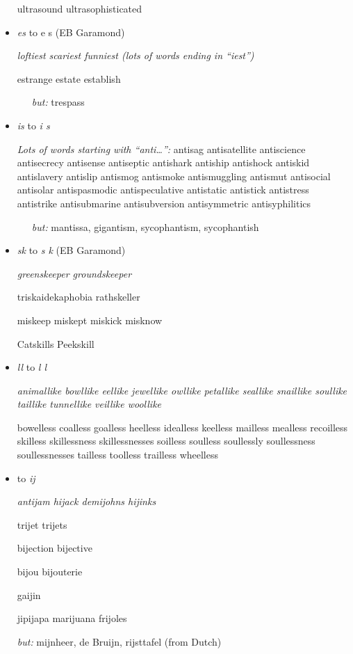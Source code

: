 \begin{itemize}
ultrasound ultrasophisticated

\egroup

\item {\ebg \emph{es} to e\kern0pt s (EB Garamond)}

\bgroup \ebg \em
 loftiest scariest funniest \emph{(lots of words ending in ``iest'')}

estrange estate establish 

\ \ \ \emph{but:} trespass 


\egroup


\item \emph{is} to \emph{i\kern0pt s}

\bgroup \em

\emph{Lots of words \emph{starting} with ``anti\dots'':} antisag antisatellite antiscience antisecrecy antisense antiseptic antishark antiship antishock antiskid antislavery antislip antismog antismoke antismuggling antismut antisocial antisolar antispasmodic antispeculative antistatic antistick antistress antistrike antisubmarine antisubversion antisymmetric antisyphilitics 

\ \ \ \emph{but:} mantissa, gigantism, sycophantism, sycophantish

\egroup

\item {\ebg \emph{sk} to \emph{s\kern0pt k} (EB Garamond)}

\bgroup \ebg \em
greenskeeper groundskeeper 

triskaidekaphobia rathskeller

miskeep miskept miskick misknow

Catskills Peekskill

\egroup



\item \emph{ll} to \emph{l\kern0pt l}

\bgroup \em
animallike bowllike eellike jewellike owllike petallike seallike snaillike soullike taillike tunnellike veillike woollike

bowelless coalless goalless heelless idealless keelless mailless mealless recoilless skilless skillessness skillessnesses soilless soulless soullessly soullessness soullessnesses tailless toolless trailless wheelless

\egroup

\item \emph{} to \emph{ij}

\bgroup \em
antijam hijack demijohns hijinks

trijet trijets

bijection bijective 

bijou bijouterie 

gaijin

jipijapa marijuana frijoles 

\emph{but:} mijnheer, de Bruijn, rijsttafel (from Dutch)


\egroup

\end{itemize}



